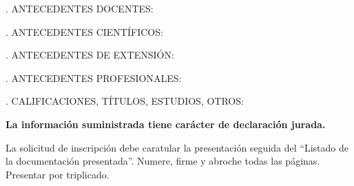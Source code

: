 \documentclass{article}
\begin{document}
\label{begin-docentes}
. ANTECEDENTES DOCENTES:

\bigskip
\noindent 
\label{end-docentes}

\bigskip

\label{begin-cientificos}
. ANTECEDENTES CIENT\'IFICOS:

\bigskip
\noindent 
\label{end-cientificos}

\bigskip

\label{begin-extension}
. ANTECEDENTES DE EXTENSI\'ON:

\bigskip
\noindent 
\label{end-extension}

\bigskip

\label{begin-profesionales}
. ANTECEDENTES PROFESIONALES:

\bigskip
\noindent 
\label{end-profesionales}

\bigskip

\label{begin-otros}
. CALIFICACIONES, T\'ITULOS, ESTUDIOS, OTROS:

\bigskip
\noindent 
\label{end-otros}

\vfill

\begin{center}
{\bf La informaci\'on suministrada tiene car\'acter de declaraci\'on jurada.

La solicitud de inscripci\'on debe caratular la presentaci\'on seguida del ``Listado de la documentaci\'on presentada''. Numere, firme y abroche todas las p\'aginas. Presentar por triplicado.}
\end{center}
\end{document}
